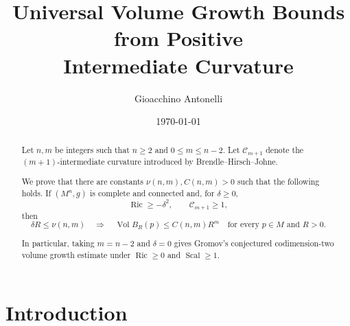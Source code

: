\documentclass[11pt]{amsart}
\title{Universal Volume Growth Bounds from Positive\\
Intermediate Curvature}
\author{Gioacchino Antonelli}
\date{\today}
\theoremstyle{definition}
\theoremstyle{remark}
\DeclareMathOperator{\Ric}{Ric}
\DeclareMathOperator{\Scal}{Scal}
\DeclareMathOperator{\Vol}{Vol}
\begin{document}
\begin{abstract}
Let $n,m$ be integers such that $n\geq2$ and
$0\leq m\leq n-2$. Let $\mathcal C_{m+1}$ denote the
$(m+1)$-intermediate curvature introduced by
Brendle--Hirsch--Johne. 

We prove that there are constants
$\nu(n,m),C(n,m)>0$ such that the following holds. If $(M^n,g)$ is complete and
connected and, for $\delta\geq 0$,
\[
 \Ric\geq-\delta^2,
 \qquad
 \mathcal C_{m+1}\geq 1,
\]
then
\[
 \delta R\leq\nu(n,m)
 \quad\Longrightarrow\quad
 \Vol B_R(p)
 \leq C(n,m)R^m \quad \text{for every $p\in M$ and $R>0$.}
\]

In particular, taking $m=n-2$ and $\delta=0$ gives Gromov's conjectured codimension-two volume
growth estimate under $\Ric \geq0$ and $\Scal \geq1$.
\end{abstract}
\maketitle

\section{Introduction}
\end{document}
